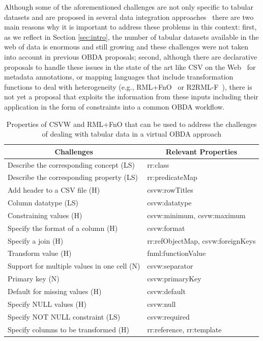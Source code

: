 Although some of the aforementioned challenges are not only specific to tabular datasets and are proposed in several data integration approaches~\citep{golshan2017data,halevy2006data,doan2012principles} there are two main reasons why it is important to address these problems in this context: first, as we reflect in Section \ref{sec:intro}, the number of tabular datasets available in the web of data is enormous and still growing and these challenges were not taken into account in previous OBDA proposals; second, although there are declarative proposals to handle these issues in the state of the art like CSV on the Web~\citep{tennison2015model} for metadata annotations, or mapping languages that include transformation functions to deal with heterogeneity (e.g., RML+FnO~\citep{de2017declarative} or R2RML-F~\citep{debruyne2016r2rml}), there is not yet a proposal that exploits the information from these inputs including their application in the form of constraints into a common OBDA workflow.



\begin{table}[]
\centering
\caption[CSVW and RML+FnO properties for virtual OBDA]{Properties of CSVW and RML+FnO that can be used to address the challenges of dealing with tabular data in a virtual OBDA approach}
\label{tab:features}
\begin{tabular}{l|l}
\hline
\multicolumn{1}{c|}{\textbf{Challenges}} & \multicolumn{1}{c}{\textbf{Relevant Properties}} \\ \hline
Describe the corresponding concept (LS) & rr:class \\ \hline
Describe the corresponding property (LS) & rr:predicateMap \\ \hline
Add header to a CSV file (H) & csvw:rowTitles \\ \hline
Column datatype (LS) & csvw:datatype \\ \hline
Constraining values (H) & csvw:minimum, csvw:maximum \\ \hline
Specify the format of a column (H) & csvw:format \\ \hline
Specify a join (H) & rr:refObjectMap, csvw:foreignKeys \\ \hline
Transform value (H) & fnml:functionValue \\ \hline
Support for multiple values in one cell (N) & csvw:separator \\ \hline
Primary key (N) &  csvw:primaryKey \\ \hline
Default for missing values (H) & csvw:default \\ \hline
Specify NULL values (H) & csvw:null \\ \hline
Specify NOT NULL constraint (LS) & csvw:required \\ \hline
Specify columns to be transformed (H) & rr:reference, rr:template \\ \hline
\end{tabular}

\end{table}

